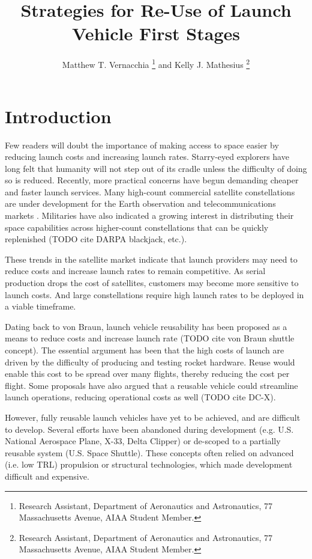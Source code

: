 \documentclass[conf]{new-aiaa}
\title{Strategies for Re-Use of Launch Vehicle First Stages}
\author{Matthew T. Vernacchia \footnote{Research Assistant, Department of Aeronautics and Astronautics, 77 Massachusetts Avenue, AIAA Student Member.}
and Kelly J. Mathesius  \footnote{Research Assistant, Department of Aeronautics and Astronautics, 77 Massachusetts Avenue, AIAA Student Member.}}
\affil{Massachusetts Institute of Technology, Cambridge, MA, 02139}
\begin{document}
\maketitle

\section{Introduction}

Few readers will doubt the importance of making access to space easier by reducing launch costs and increasing launch rates. Starry-eyed explorers have long felt that humanity will not step out of its cradle unless the difficulty of doing so is reduced. Recently, more practical concerns have begun demanding cheaper and faster launch services. Many high-count commercial satellite constellations are under development for the Earth observation and telecommunications markets \cite{SIA2017, Henry2017}. Militaries have also indicated a growing interest in distributing their space capabilities across higher-count constellations that can be quickly replenished (TODO cite DARPA blackjack, etc.).

These trends in the satellite market indicate that launch providers may need to reduce costs and increase launch rates to remain competitive. As serial production drops the cost of satellites, customers may become more sensitive to launch costs. And large constellations require high launch rates to be deployed in a viable timeframe.

Dating back to von Braun, launch vehicle reusability has been proposed as a means to reduce costs and increase launch rate (TODO cite von Braun shuttle concept). The essential argument has been that the high costs of launch are driven by the difficulty of producing and testing rocket hardware. Reuse would enable this cost to be spread over many flights, thereby reducing the cost per flight. Some proposals have also argued that a reusable vehicle could streamline launch operations, reducing operational costs as well (TODO cite DC-X).

However, fully reusable launch vehicles have yet to be achieved, and are difficult to develop. Several efforts have been abandoned during development (e.g. U.S. National Aerospace Plane, X-33, Delta Clipper) or de-scoped to a partially reusable system (U.S. Space Shuttle). These concepts often relied on advanced (i.e. low TRL) propulsion or structural technologies, which made development difficult and expensive.
\end{document}
